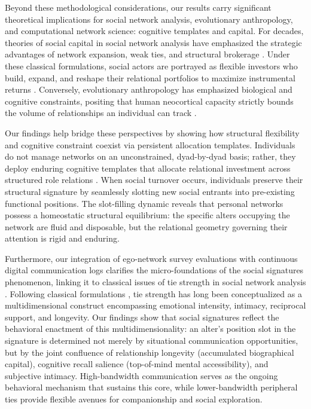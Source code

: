 \documentclass[11pt,letterpaper]{article}
\begin{document}
Beyond these methodological considerations, our results carry significant theoretical implications for social network analysis, evolutionary anthropology, and computational network science: cognitive templates and capital. For decades, theories of social capital in social network analysis have emphasized the strategic advantages of network expansion, weak ties, and structural brokerage \citep{granovetter1973strength}. Under these classical formulations, social actors are portrayed as flexible investors who build, expand, and reshape their relational portfolios to maximize instrumental returns \citep{burt1992structural}. Conversely, evolutionary anthropology has emphasized biological and cognitive constraints, positing that human neocortical capacity strictly bounds the volume of relationships an individual can track \citep{dunbar1998social,dunbar2018anatomy}.

Our findings help bridge these perspectives by showing how structural flexibility and cognitive constraint coexist via persistent allocation templates. Individuals do not manage networks on an unconstrained, dyad-by-dyad basis; rather, they deploy enduring cognitive templates that allocate relational investment across structured role relations \citep{fiske2004four-0f8}. When social turnover occurs, individuals preserve their structural signature by seamlessly slotting new social entrants into pre-existing functional positions. The slot-filling dynamic reveals that personal networks possess a homeostatic structural equilibrium: the specific alters occupying the network are fluid and disposable, but the relational geometry governing their attention is rigid and enduring.

Furthermore, our integration of ego-network survey evaluations with continuous digital communication logs clarifies the micro-foundations of the social signatures phenomenon, linking it to classical issues of tie strength in social network analysis \citep{granovetter1973strength}. Following classical formulations \citep{granovetter1973strength,marsden1984measuring-f62,burt2000decay-f08}, tie strength has long been conceptualized as a multidimensional construct encompassing emotional intensity, intimacy, reciprocal support, and longevity. Our findings show that social signatures reflect the behavioral enactment of this multidimensionality: an alter's position slot in the signature is determined not merely by situational communication opportunities, but by the joint confluence of relationship longevity (accumulated biographical capital), cognitive recall salience (top-of-mind mental accessibility), and subjective intimacy. High-bandwidth communication serves as the ongoing behavioral mechanism that sustains this core, while lower-bandwidth peripheral ties provide flexible avenues for companionship and social exploration.
\end{document}
